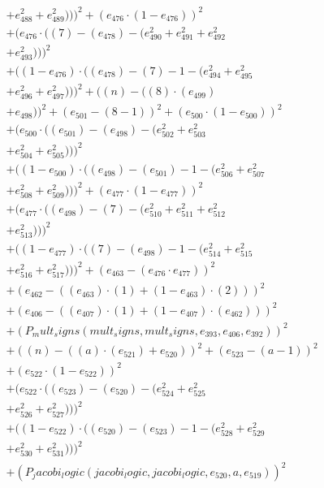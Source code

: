 \documentclass[10pt, a4paper]{article}
\begin{document}
\begin{small}
\begin{align*}
& + e_{488}^{2} + e_{489}^{2})))^{2} + (e_{476}  \cdot  (1 - e_{476}))^{2} \\
& + (e_{476}  \cdot  ((7) - (e_{478}) - (e_{490}^{2} + e_{491}^{2} + e_{492}^{2} \\
& + e_{493}^{2})))^{2} \\
& + ((1 - e_{476})  \cdot  ((e_{478}) - (7) - 1 - (e_{494}^{2} + e_{495}^{2} \\
& + e_{496}^{2} + e_{497}^{2})))^{2} + ((n) - ((8)  \cdot  (e_{499}) \\
& + e_{498}))^{2} + (e_{501} - (8 - 1))^{2} + (e_{500}  \cdot  (1 - e_{500}))^{2} \\
& + (e_{500}  \cdot  ((e_{501}) - (e_{498}) - (e_{502}^{2} + e_{503}^{2} \\
& + e_{504}^{2} + e_{505}^{2})))^{2} \\
& + ((1 - e_{500})  \cdot  ((e_{498}) - (e_{501}) - 1 - (e_{506}^{2} + e_{507}^{2} \\
& + e_{508}^{2} + e_{509}^{2})))^{2} + (e_{477}  \cdot  (1 - e_{477}))^{2} \\
& + (e_{477}  \cdot  ((e_{498}) - (7) - (e_{510}^{2} + e_{511}^{2} + e_{512}^{2} \\
& + e_{513}^{2})))^{2} \\
& + ((1 - e_{477})  \cdot  ((7) - (e_{498}) - 1 - (e_{514}^{2} + e_{515}^{2} \\
& + e_{516}^{2} + e_{517}^{2})))^{2} + (e_{463} - (e_{476}  \cdot  e_{477}))^{2} \\
& + (e_{462} - ((e_{463})  \cdot  (1) + (1 - e_{463})  \cdot  (2)))^{2} \\
& + (e_{406} - ((e_{407})  \cdot  (1) + (1 - e_{407})  \cdot  (e_{462})))^{2} \\
& + (P_mult_signs(mult_signs, mult_signs, e_{393}, e_{406}, e_{392}))^{2} \\
& + ((n) - ((a)  \cdot  (e_{521}) + e_{520}))^{2} + (e_{523} - (a - 1))^{2} \\
& + (e_{522}  \cdot  (1 - e_{522}))^{2} \\
& + (e_{522}  \cdot  ((e_{523}) - (e_{520}) - (e_{524}^{2} + e_{525}^{2} \\
& + e_{526}^{2} + e_{527}^{2})))^{2} \\
& + ((1 - e_{522})  \cdot  ((e_{520}) - (e_{523}) - 1 - (e_{528}^{2} + e_{529}^{2} \\
& + e_{530}^{2} + e_{531}^{2})))^{2} \\
& + (P_jacobi_logic(jacobi_logic, jacobi_logic, e_{520}, a, e_{519}))^{2} \\

\end{align*}
\end{small}
\end{document}
